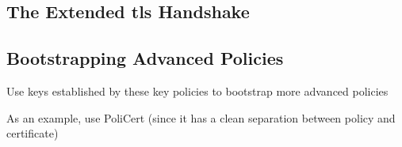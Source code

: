 \subsection{The Extended \ac{tls} Handshake}
\label{sec:design:handshake}


\subsection{Bootstrapping Advanced Policies}
\label{sec:design:bootstrapping}

\begin{compactitem}
\item Use keys established by these key policies to bootstrap more advanced
  policies
\item As an example, use PoliCert (since it has a clean separation between
  policy and certificate)
\end{compactitem}

